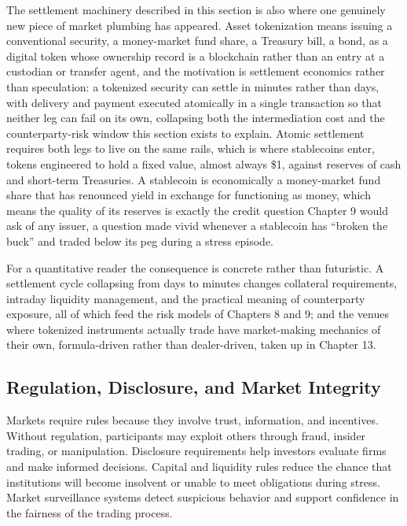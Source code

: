 \documentclass[../ai_in_finance]{subfiles}
\begin{document}
The settlement machinery described in this section is also where one genuinely new piece of market plumbing has appeared. Asset tokenization means issuing a conventional security, a money-market fund share, a Treasury bill, a bond, as a digital token whose ownership record is a blockchain rather than an entry at a custodian or transfer agent, and the motivation is settlement economics rather than speculation: a tokenized security can settle in minutes rather than days, with delivery and payment executed atomically in a single transaction so that neither leg can fail on its own, collapsing both the intermediation cost and the counterparty-risk window this section exists to explain. Atomic settlement requires both legs to live on the same rails, which is where stablecoins enter, tokens engineered to hold a fixed value, almost always \$1, against reserves of cash and short-term Treasuries. A stablecoin is economically a money-market fund share that has renounced yield in exchange for functioning as money, which means the quality of its reserves is exactly the credit question Chapter 9 would ask of any issuer, a question made vivid whenever a stablecoin has ``broken the buck'' and traded below its peg during a stress episode.

For a quantitative reader the consequence is concrete rather than futuristic. A settlement cycle collapsing from days to minutes changes collateral requirements, intraday liquidity management, and the practical meaning of counterparty exposure, all of which feed the risk models of Chapters 8 and 9; and the venues where tokenized instruments actually trade have market-making mechanics of their own, formula-driven rather than dealer-driven, taken up in Chapter 13.

\subsection{Regulation, Disclosure, and Market Integrity}

Markets require rules because they involve trust, information, and incentives. Without regulation, participants may exploit others through fraud, insider trading, or manipulation. Disclosure requirements help investors evaluate firms and make informed decisions. Capital and liquidity rules reduce the chance that institutions will become insolvent or unable to meet obligations during stress. Market surveillance systems detect suspicious behavior and support confidence in the fairness of the trading process.
\end{document}
